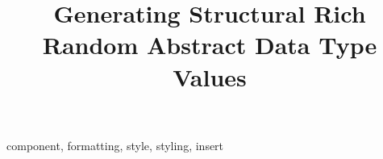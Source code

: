\documentclass[conference, fleqn]{IEEEtran}
\begin{document}
\title{Generating Structural Rich \\ Random Abstract Data Type Values }

\author{
\and
{}
}

\maketitle


\newenvironment{CompactItemize}%
  {\begin{list}{$\, \  \blacktriangleright$}%
   {\leftmargin=0pt \itemsep=2pt \topsep=5pt
     \parsep=0pt \partopsep=0pt}}%
  {\end{list}}




\begin{IEEEkeywords}
component, formatting, style, styling, insert
\end{IEEEkeywords}















\end{document}
